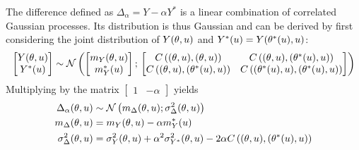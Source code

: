 \documentclass[../../Main_ManuscritThese.tex]{subfiles}
\begin{document}
The difference defined as  $\Delta_{\alpha} = Y - \alpha Y^*$ is a linear combination of correlated Gaussian processes. Its distribution is thus Gaussian and can be derived by first considering the joint distribution of $Y(\theta,u)$ and $Y^*(u) = Y(\theta^*(u), u)$:
\begin{equation}
  \begin{bmatrix}
    Y(\theta,u) \\
    Y^*(u)
  \end{bmatrix}
  \sim \mathcal{N}\left(
    \begin{bmatrix}
      m_Y(\theta,u) \\
      m_Y^*(u)
    \end{bmatrix}
    ;\,
    \begin{bmatrix}
      C\left((\theta,u),(\theta,u)\right) & C\left((\theta,u),(\theta^*(u),u)\right) \\
      C\left((\theta,u),(\theta^*(u),u)\right) & C\left((\theta^*(u),u),(\theta^*(u),u)\right)
    \end{bmatrix}
\right)
\end{equation}
Multiplying by the matrix $\begin{bmatrix}1 & -\alpha \end{bmatrix}$ yields
\begin{align}
  \Delta_{\alpha}(\theta,u) &\sim \mathcal{N}\left(m_{\Delta}(\theta,u); \sigma^2_{\Delta}(\theta,u)\right)  \label{eq:delta_GP}\\
  m_{\Delta}(\theta,u) &= m_Y(\theta,u) - \alpha m_Y^*(u) \label{eq:mu_delta_GP}\\
  \sigma^2_{\Delta}(\theta,u) &= \sigma_Y^2(\theta,u) + \alpha^2 \sigma_{Y^*}^2(\theta,u) - 2\alpha C\left((\theta,u),(\theta^*(u),u)\right) \label{eq:variance_delta_GP}
\end{align}
\end{document}
